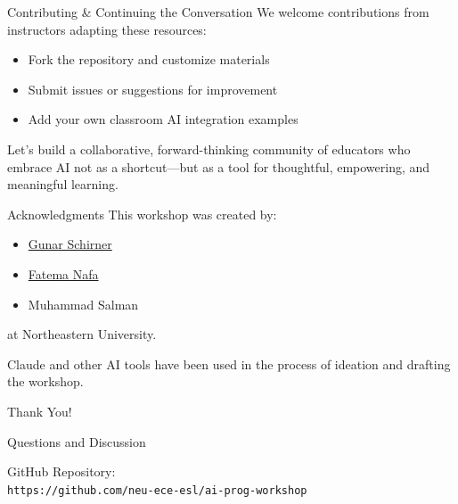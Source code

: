 \documentclass[xcolor=dvipsnames, aspectratio=169]{beamer}
\begin{document}
\begin{frame}{Contributing \& Continuing the Conversation}
  We welcome contributions from instructors adapting these resources:
  \begin{itemize}
    \item Fork the repository and customize materials
    \item Submit issues or suggestions for improvement
    \item Add your own classroom AI integration examples
  \end{itemize}
  
  Let's build a collaborative, forward-thinking community of educators who embrace AI not as a shortcut—but as a tool for thoughtful, empowering, and meaningful learning.
\end{frame}

\begin{frame}{Acknowledgments}
  This workshop was created by:
  \begin{itemize}
    \item \href{https://coe.northeastern.edu/people/schirner-gunar/}{Gunar Schirner}
    \item \href{https://coe.northeastern.edu/people/nafa-fatema/}{Fatema Nafa}
    \item Muhammad Salman
  \end{itemize}
  
  at Northeastern University.
  
  \vspace{1em}
  
  Claude and other AI tools have been used in the process of ideation and drafting the workshop.
\end{frame}

\begin{frame}{Thank You!}
  \begin{center}
    \Large{Questions and Discussion}
    
    \vspace{2em}
    
    GitHub Repository:\\
    \texttt{https://github.com/neu-ece-esl/ai-prog-workshop}
  \end{center}
\end{frame}
\end{document}
